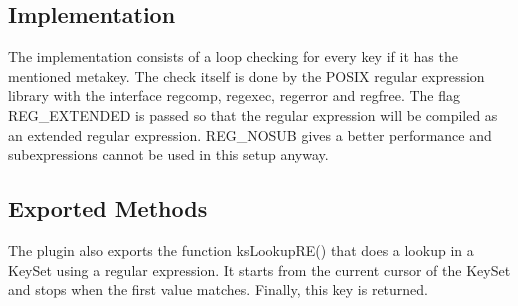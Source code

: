 \subsection*{Implementation}

The implementation consists of a loop checking for every key if it has the mentioned metakey. The check itself is done by the P\+O\+S\+I\+X regular expression library with the interface {\ttfamily regcomp}, {\ttfamily regexec}, {\ttfamily regerror} and {\ttfamily regfree}. The flag {\ttfamily R\+E\+G\+\_\+\+E\+X\+T\+E\+N\+D\+E\+D} is passed so that the regular expression will be compiled as an extended regular expression. {\ttfamily R\+E\+G\+\_\+\+N\+O\+S\+U\+B} gives a better performance and subexpressions cannot be used in this setup anyway.

\subsection*{Exported Methods}

The plugin also exports the function {\ttfamily ks\+Lookup\+R\+E()} that does a lookup in a Key\+Set using a regular expression. It starts from the current cursor of the Key\+Set and stops when the first value matches. Finally, this key is returned. 